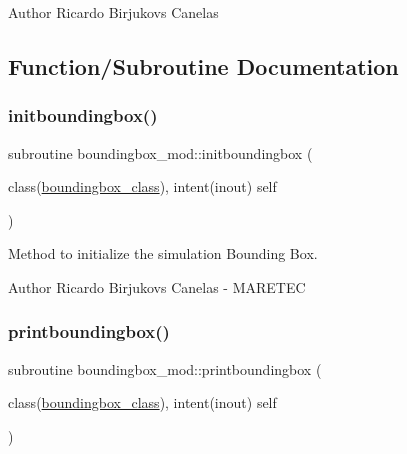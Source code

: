 \begin{DoxyAuthor}{Author}
Ricardo Birjukovs Canelas 
\end{DoxyAuthor}


\subsection{Function/\+Subroutine Documentation}
\mbox{\label{namespaceboundingbox__mod_a35e41bb92c19802441dd8d748c3acfb4}} 
\subsubsection{\texorpdfstring{initboundingbox()}{initboundingbox()}}
{\footnotesize\ttfamily subroutine boundingbox\+\_\+mod\+::initboundingbox (\begin{DoxyParamCaption}\item[{class(\hyperlink{structboundingbox__mod_1_1boundingbox__class}{boundingbox\+\_\+class}), intent(inout)}]{self }\end{DoxyParamCaption})\hspace{0.3cm}{\ttfamily [private]}}



Method to initialize the simulation Bounding Box. 

\begin{DoxyAuthor}{Author}
Ricardo Birjukovs Canelas -\/ M\+A\+R\+E\+T\+EC 
\end{DoxyAuthor}
\mbox{\label{namespaceboundingbox__mod_a6ec461b758bc180dc72b5fb23169feca}} 
\subsubsection{\texorpdfstring{printboundingbox()}{printboundingbox()}}
{\footnotesize\ttfamily subroutine boundingbox\+\_\+mod\+::printboundingbox (\begin{DoxyParamCaption}\item[{class(\hyperlink{structboundingbox__mod_1_1boundingbox__class}{boundingbox\+\_\+class}), intent(inout)}]{self }\end{DoxyParamCaption})\hspace{0.3cm}{\ttfamily [private]}}



